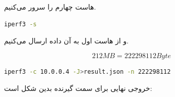 \documentclass[12pt]{article}
\begin{document}
\begin{enumerate}
هاست چهارم را سرور می‌کنیم.

\begin{latin}
	\begin{lstlisting}[language=bash]
		iperf3 -s
	\end{lstlisting}
\end{latin}

و از هاست اول به آن داده ارسال می‌کنیم.

$$212 MB = 222298112 Byte$$


\begin{latin}
	\begin{lstlisting}[language=bash]
		 iperf3 -c 10.0.0.4 -J>result.json -n 222298112 
	\end{lstlisting}
\end{latin}

خروجی نهایی برای سمت گیرنده بدین شکل است:


\end{enumerate}
\end{document}
